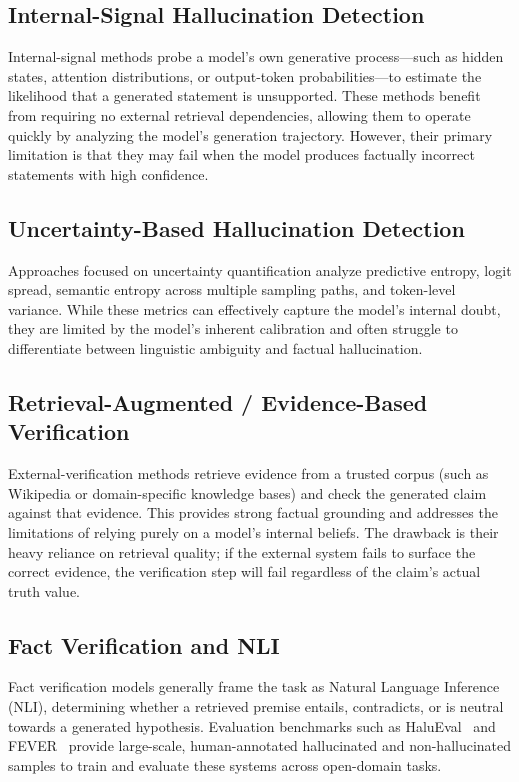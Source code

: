 \documentclass[conference]{IEEEtran}
\begin{document}
\subsection{Internal-Signal Hallucination Detection}
Internal-signal methods probe a model’s own generative process---such as hidden states, attention distributions, or output-token probabilities---to estimate the likelihood that a generated statement is unsupported. These methods benefit from requiring no external retrieval dependencies, allowing them to operate quickly by analyzing the model's generation trajectory. However, their primary limitation is that they may fail when the model produces factually incorrect statements with high confidence.

\subsection{Uncertainty-Based Hallucination Detection}
Approaches focused on uncertainty quantification analyze predictive entropy, logit spread, semantic entropy across multiple sampling paths, and token-level variance. While these metrics can effectively capture the model's internal doubt, they are limited by the model's inherent calibration and often struggle to differentiate between linguistic ambiguity and factual hallucination.

\subsection{Retrieval-Augmented / Evidence-Based Verification}
External-verification methods retrieve evidence from a trusted corpus (such as Wikipedia or domain-specific knowledge bases) and check the generated claim against that evidence. This provides strong factual grounding and addresses the limitations of relying purely on a model's internal beliefs. The drawback is their heavy reliance on retrieval quality; if the external system fails to surface the correct evidence, the verification step will fail regardless of the claim's actual truth value.

\subsection{Fact Verification and NLI}
Fact verification models generally frame the task as Natural Language Inference (NLI), determining whether a retrieved premise entails, contradicts, or is neutral towards a generated hypothesis. Evaluation benchmarks such as HaluEval~\cite{li2023halueval} and FEVER~\cite{thorne2018fever} provide large-scale, human-annotated hallucinated and non-hallucinated samples to train and evaluate these systems across open-domain tasks.
\end{document}
